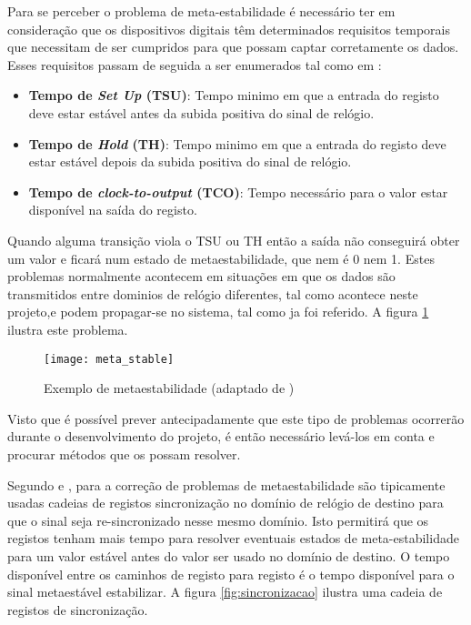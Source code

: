 Para se perceber o problema de meta-estabilidade é necessário ter em consideração que os dispositivos digitais têm determinados requisitos temporais que necessitam de ser cumpridos para que possam captar corretamente os dados. Esses requisitos passam de seguida a ser enumerados tal como em \cite{R037}:

\begin{itemize}
	\item \textbf{Tempo de \textit{Set Up} (T{\tiny SU})}: Tempo minimo em que a entrada do registo deve estar estável antes da subida positiva do sinal de relógio.
	\item \textbf{Tempo de \textit{Hold} (T{\tiny H})}: Tempo minimo em que a entrada do registo deve estar estável depois da subida positiva do sinal de relógio.
	\item \textbf{Tempo de \textit{clock-to-output} (T{\tiny CO})}: Tempo necessário para o valor estar disponível na saída do registo.
\end{itemize}
 
Quando alguma transição viola o T{\tiny SU} ou T{\tiny H} então a saída não conseguirá obter um valor e ficará num estado de metaestabilidade, que nem é 0 nem 1. Estes problemas normalmente acontecem em situações em que os dados são transmitidos entre dominios de relógio diferentes, tal como acontece neste projeto,e podem propagar-se no sistema, tal como ja foi referido. A figura \ref{fig:metaestabilidade} ilustra este problema.

\begin{figure}[h!]
	\begin{center}
		\leavevmode
		\texttt{[image: meta\_stable]}
		\caption[Exemplo de metaestabilidade]{Exemplo de metaestabilidade (adaptado de \cite{R037})}
		\label{fig:metaestabilidade}
	\end{center}
\end{figure}

Visto que é possível prever antecipadamente que este tipo de problemas ocorrerão durante o desenvolvimento do projeto, é então necessário levá-los em conta e procurar métodos que os possam resolver.

Segundo \cite{R037} e \cite{R024}, para a correção de problemas de metaestabilidade são tipicamente usadas cadeias de registos sincronização no domínio de relógio de destino para que o sinal seja re-sincronizado nesse mesmo domínio. Isto permitirá que os registos tenham mais tempo para resolver eventuais estados de meta-estabilidade para um valor estável antes do valor ser usado no domínio de destino.  O tempo disponível entre os caminhos de registo para registo é o tempo disponível para o sinal metaestável estabilizar. A figura \ref{fig:sincronizacao} ilustra uma cadeia de registos de sincronização.


